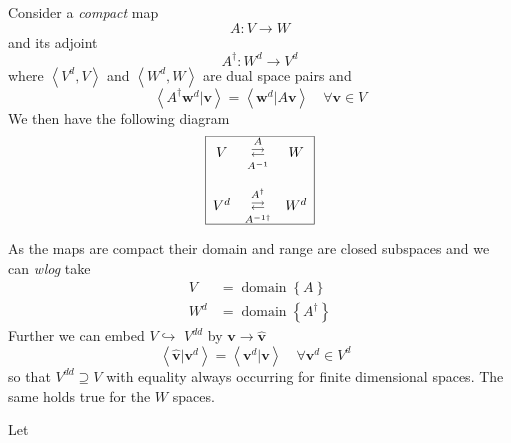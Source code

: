 \documentclass[aps,preprint]{revtex4}%
\begin{document}
Consider a \emph{compact} map
\begin{equation}
A:V\longrightarrow W
\end{equation}
and its adjoint
\begin{equation}
A^{\dagger}:W^{d}\longrightarrow V^{d}%
\end{equation}
where $\left\langle V^{d},V\right\rangle $ and $\left\langle W^{d}%
,W\right\rangle $ are dual space pairs and
\begin{equation}
\left\langle A^{\dagger}\mathbf{w}^{d}|\mathbf{v}\right\rangle =\left\langle
\mathbf{w}^{d}|A\mathbf{v}\right\rangle \quad\forall\mathbf{v\in}V
\end{equation}
We then have the following diagram
\begin{equation}
\frame{$%
\begin{array}
[c]{ccc}%
V & \overset{A}{\underset{A^{-1}}{{\LARGE \rightleftarrows}}} & W\\
&  & \\
V^{d} & \overset{A^{\dagger}}{\underset{A^{-1\dagger}}%
{{\LARGE \rightleftarrows}}} & W^{d}%
\end{array}
$}%
\end{equation}
As the maps are compact their domain and range are closed subspaces and we can
\textit{wlog }take
\begin{align}
V  & =\operatorname{domain}\left\{  A\right\}  \nonumber\\
W^{d}  & =\operatorname{domain}\left\{  A^{\dagger}\right\}
\end{align}
Further we can embed $V\hookrightarrow$ $V^{dd}$ by $\mathbf{v\rightarrow
\hat{v}}$
\begin{equation}
\left\langle \mathbf{\hat{v}}|\mathbf{v}^{d}\right\rangle =\left\langle
\mathbf{v}^{d}|\mathbf{v}\right\rangle \quad\forall\mathbf{v}^{d}\in
V^{d}\text{ }%
\end{equation}
so that $V^{dd}\supseteq V$ with equality always occurring for finite
dimensional spaces. The same holds true for the $W$ spaces.

Let
\end{document}
